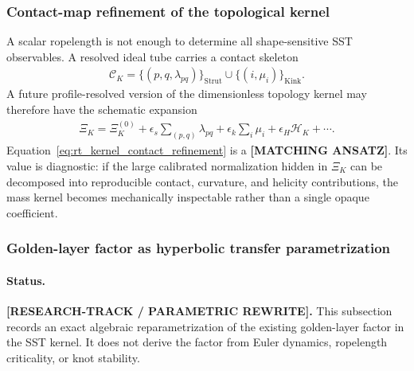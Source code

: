 \subsubsection{Contact-map refinement of the topological kernel}
\label{subsubsec:rt_contact_map_refinement}
A scalar ropelength is not enough to determine all shape-sensitive SST
observables.  A resolved ideal tube carries a contact skeleton
\begin{align}
    \mathcal C_K
    =
    \bigl\{(p,q,\lambda_{pq})\bigr\}_{\operatorname{Strut}}
    \cup
    \bigl\{(i,\mu_i)\bigr\}_{\operatorname{Kink}} .
    \label{eq:rt_contact_skeleton}
\end{align}
A future profile-resolved version of the dimensionless topology kernel may
therefore have the schematic expansion
\begin{align}
    \Xi_K
    =
    \Xi_K^{(0)}
    +\epsilon_s\sum_{(p,q)}\lambda_{pq}
    +\epsilon_k\sum_i\mu_i
    +\epsilon_H\mathcal H_K
    +\cdots .
    \label{eq:rt_kernel_contact_refinement}
\end{align}
Equation~\eqref{eq:rt_kernel_contact_refinement} is a
\textbf{[MATCHING ANSATZ]}.  Its value is diagnostic: if the large calibrated
normalization hidden in $\Xi_K$ can be decomposed into reproducible contact,
curvature, and helicity contributions, the mass kernel becomes mechanically
inspectable rather than a single opaque coefficient.

\subsubsection{Golden-layer factor as hyperbolic transfer parametrization}
\paragraph{Status.}
\textbf{[RESEARCH-TRACK / PARAMETRIC REWRITE].}
This subsection records an exact algebraic reparametrization of the
existing golden-layer factor in the SST kernel.  It does not derive the
factor from Euler dynamics, ropelength criticality, or knot stability.

